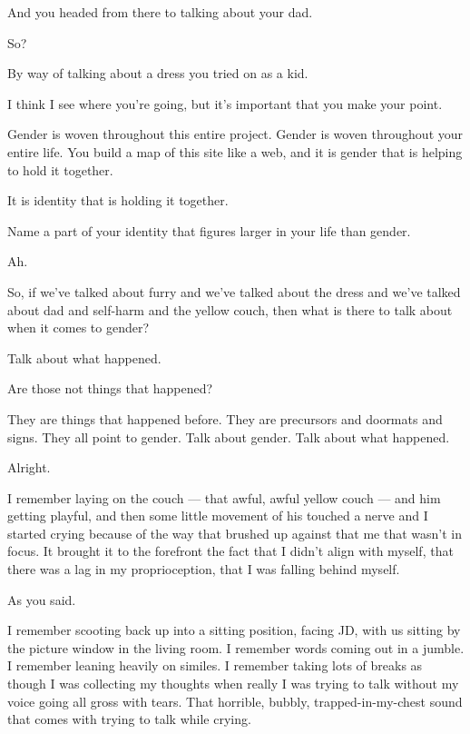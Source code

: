 \begin{ally}
And you headed from there to talking about your dad.
\end{ally}
So?

\begin{ally}
By way of talking about a dress you tried on as a kid.
\end{ally}
I think I see where you're going, but it's important that you make your point.

\begin{ally}
Gender is woven throughout this entire project. Gender is woven throughout your entire life. You build a map of this site like a web, and it is gender that is helping to hold it together.
\end{ally}
It is identity that is holding it together.

\begin{ally}
Name a part of your identity that figures larger in your life than gender.
\end{ally}
Ah.
\newpage

So, if we've talked about furry and we've talked about the dress and we've talked about dad and self-harm and the yellow couch, then what is there to talk about when it comes to gender?

\begin{ally}
Talk about what happened.
\end{ally}
Are those not things that happened?

\begin{ally}
They are things that happened before. They are precursors and doormats and signs. They all point to gender. Talk about gender. Talk about what happened.
\end{ally}
Alright.

I remember laying on the couch --- that awful, awful yellow couch --- and him getting playful, and then some little movement of his touched a nerve and I started crying because of the way that brushed up against that me that wasn't in focus. It brought it to the forefront the fact that I didn't align with myself, that there was a lag in my proprioception, that I was falling behind myself.

\begin{ally}
As you said.
\end{ally}
I remember scooting back up into a sitting position, facing JD, with us sitting by the picture window in the living room. I remember words coming out in a jumble. I remember leaning heavily on similes. I remember taking lots of breaks as though I was collecting my thoughts when really I was trying to talk without my voice going all gross with tears. That horrible, bubbly, trapped-in-my-chest sound that comes with trying to talk while crying.

